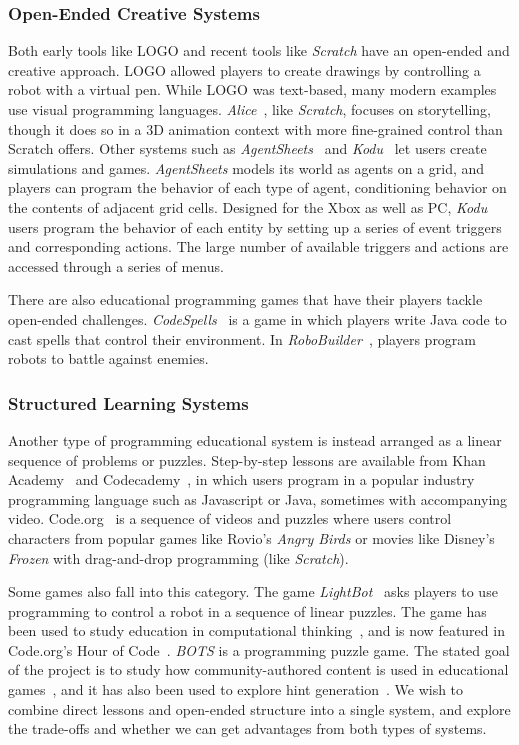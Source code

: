 \documentclass{sig-alternate}
\begin{document}
\subsubsection{Open-Ended Creative Systems}
Both early tools like LOGO and recent tools like \emph{Scratch} have an open-ended and creative approach.
LOGO allowed players to create drawings by controlling a robot with a virtual pen.
While LOGO was text-based, many modern examples use visual programming languages. 
\emph{Alice}~\cite{cooper2000alice}, like \emph{Scratch}, focuses on storytelling, though it does so in a 3D animation context with more fine-grained control than Scratch offers.
Other systems such as \emph{AgentSheets}~\cite{repenning2000agentsheets} and \emph{Kodu}~\cite{kodu} let users create simulations and games.
\emph{AgentSheets} models its world as agents on a grid, and players can program the behavior of each type of agent, conditioning behavior on the contents of adjacent grid cells. 
Designed for the Xbox as well as PC, \emph{Kodu} users program the behavior of each entity by setting up a series of event triggers and corresponding actions. The large number of available triggers and actions are accessed through a series of menus. 

There are also educational programming games that have their players tackle open-ended challenges.
\emph{CodeSpells}~\cite{esper2013codespells} is a game in which players write Java code to cast spells that control their environment. 
In \emph{RoboBuilder}~\cite{weintrop2013robobuilder}, players program robots to battle against enemies.

\subsubsection{Structured Learning Systems}
Another type of programming educational system is instead arranged as a linear sequence of problems or puzzles.
Step-by-step lessons are available from Khan Academy~\cite{khanacademy} and Codecademy~\cite{codecademy}, in which users program in a popular industry programming language such as Javascript or Java, sometimes with accompanying video.
Code.org~\cite{codedotorg} is a sequence of videos and puzzles where users control characters from popular games like Rovio's \emph{Angry Birds} or movies like Disney's \emph{Frozen} with drag-and-drop programming (like \emph{Scratch}).

Some games also fall into this category.
The game \emph{LightBot}~\cite{lightbot} asks players to use programming to control a robot in a sequence of linear puzzles.
The game has been used to study education in computational thinking~\cite{Gouws13Lightbot}, and is now featured in Code.org's Hour of Code~\cite{lightbothoc}.
\emph{BOTS} is a programming puzzle game. The stated goal of the project is to study how community-authored content is used in educational games~\cite{hickspart14}, and it has also been used to explore hint generation~\cite{peddycord14generating}.
We wish to combine direct lessons and open-ended structure into a single system, and explore the trade-offs and whether we can get advantages from both types of systems.
\end{document}
